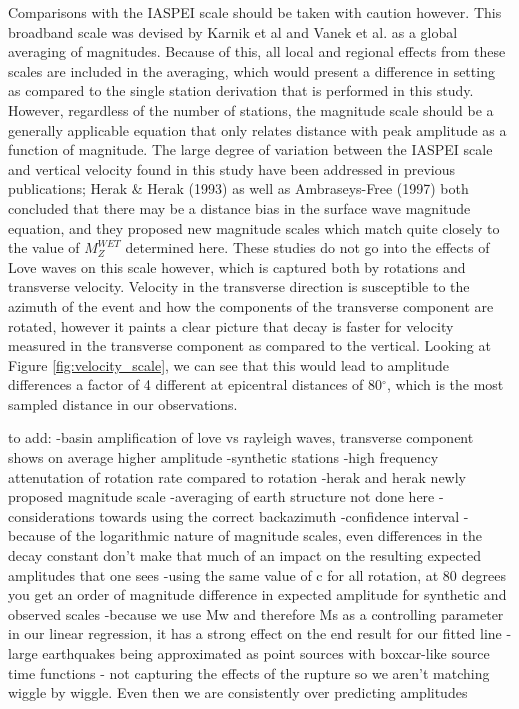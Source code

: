 \documentclass{gji}
\begin{document}
Comparisons with the IASPEI scale should be taken with caution however. This broadband scale was devised by Karnik et al and Vanek et al. as a global averaging of magnitudes. Because of this, all local and regional effects from these scales are included in the averaging, which would present a difference in setting as compared to the single station derivation that is performed in this study. However, regardless of the number of stations, the magnitude scale should be a generally applicable equation that only relates distance with peak amplitude as a function of magnitude. The large degree of variation between the IASPEI scale and vertical velocity found in this study have been addressed in previous publications; Herak \& Herak (1993) as well as Ambraseys-Free (1997) %
both concluded that there may be a distance bias in the surface wave magnitude equation, and they proposed new magnitude scales which match quite closely to the value of $M^{WET}_Z$ determined here. These studies do not go into the effects of Love waves on this scale however, which is captured both by rotations and transverse velocity. Velocity in the transverse direction is susceptible to the azimuth of the event and how the components of the transverse component are rotated, however it paints a clear picture that decay is faster for velocity measured in the transverse component as compared to the vertical. Looking at Figure \ref{fig:velocity_scale}, we can see that this would lead to amplitude differences a factor of 4 different at epicentral distances of 80$^\circ$, which is the most sampled distance in our observations.


to add: 
-basin amplification of love vs rayleigh waves, transverse component shows on average higher amplitude
-synthetic stations
-high frequency attenutation of rotation rate compared to rotation
-herak and herak newly proposed magnitude scale
-averaging of earth structure not done here
-considerations towards using the correct backazimuth
-confidence interval
-because of the logarithmic nature of magnitude scales, even differences in the decay constant don't make that much of an impact on the resulting expected amplitudes that one sees 
-using the same value of c for all rotation, at 80 degrees you get an order of magnitude difference in expected amplitude for synthetic and observed scales
-because we use Mw and therefore Ms as a controlling parameter in our linear regression, it has a strong effect on the end result for our fitted line
-large earthquakes being approximated as point sources with boxcar-like source time functions - not capturing the effects of the rupture so we aren't matching wiggle by wiggle. Even then we are consistently over predicting amplitudes 
\end{document}
